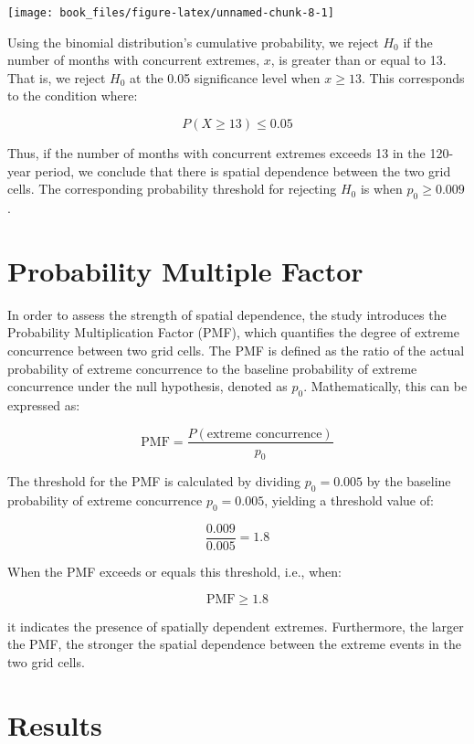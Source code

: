 \documentclass[
]{krantz}
\begin{document}
\begin{center}\texttt{[image: book\_files/figure-latex/unnamed-chunk-8-1]} \end{center}
\vspace{1em}

Using the binomial distribution's cumulative probability, we reject \(H_0\) if the number of months with concurrent extremes, \(x\), is greater than or equal to 13. That is, we reject \(H_0\) at the 0.05 significance level when \(x \geq 13\). This corresponds to the condition where:

\[
P(X \geq 13) \leq 0.05
\]

Thus, if the number of months with concurrent extremes exceeds 13 in the 120-year period, we conclude that there is spatial dependence between the two grid cells. The corresponding probability threshold for rejecting \(H_0\) is when \(p_0 \geq 0.009\).

\section{Probability Multiple Factor}\label{probability-multiple-factor}

In order to assess the strength of spatial dependence, the study introduces the Probability Multiplication Factor (PMF), which quantifies the degree of extreme concurrence between two grid cells. The PMF is defined as the ratio of the actual probability of extreme concurrence to the baseline probability of extreme concurrence under the null hypothesis, denoted as \(p_0\). Mathematically, this can be expressed as:

\[
\text{PMF} = \frac{P(\text{extreme concurrence})}{p_0}
\]

The threshold for the PMF is calculated by dividing \(p_0 = 0.005\) by the baseline probability of extreme concurrence \(p_0 = 0.005\), yielding a threshold value of:

\[
\frac{0.009}{0.005} = 1.8
\]

When the PMF exceeds or equals this threshold, i.e., when:

\[
\text{PMF} \geq 1.8
\]

it indicates the presence of spatially dependent extremes. Furthermore, the larger the PMF, the stronger the spatial dependence between the extreme events in the two grid cells.

\section{Results}\label{results-3}
\end{document}
